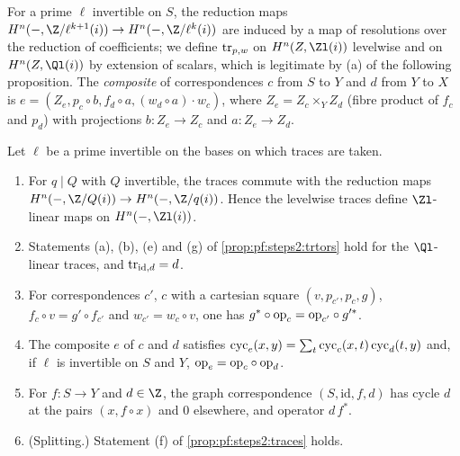 For a prime $\ell$ invertible on $S$, the reduction maps $H^n(-,\Z/\ell^{k+1}(i))\to
H^n(-,\Z/\ell^k(i))$ are induced by a map of resolutions over the reduction of coefficients; we define
$\mathrm{tr}_{p,w}$ on $H^n(Z,\Zl(i))$ levelwise and on $H^n(Z,\Ql(i))$ by extension of scalars, which
is legitimate by (a) of the following proposition. The \emph{composite} of correspondences $c$ from $S$
to $Y$ and $d$ from $Y$ to $X$ is $e=(Z_e,p_c\circ b,f_d\circ a,(w_d\circ a)\cdot w_c)$, where
$Z_e=Z_c\times_YZ_d$ (fibre product of $f_c$ and $p_d$) with projections $b\colon Z_e\to Z_c$ and
$a\colon Z_e\to Z_d$.

\begin{proposition}\label{prop:pf:steps2:tradic}
Let $\ell$ be a prime invertible on the bases on which traces are taken.
\begin{enumerate}[label=\textup{(\alph*)},nosep]
\item For $q\mid Q$ with $Q$ invertible, the traces commute with the reduction maps
  $H^n(-,\Z/Q(i))\to H^n(-,\Z/q(i))$. Hence the levelwise traces define $\Zl$-linear maps on
  $H^n(-,\Zl(i))$.
\item Statements \textup{(a)}, \textup{(b)}, \textup{(e)} and \textup{(g)} of
  \cref{prop:pf:steps2:trtors} hold for the $\Ql$-linear traces, and $\mathrm{tr}_{\mathrm{id},d}=d$.
\item For correspondences $c'$, $c$ with a cartesian square $(v,p_{c'},p_c,g)$, $f_c\circ
  v=g'\circ f_{c'}$ and $w_{c'}=w_c\circ v$, one has $g^\ast\circ\mathrm{op}_c=\mathrm{op}_{c'}\circ
  g'^\ast$.
\item The composite $e$ of $c$ and $d$ satisfies $\mathrm{cyc}_e(x,y)=\sum_t\mathrm{cyc}_c(x,t)\,
  \mathrm{cyc}_d(t,y)$ and, if $\ell$ is invertible on $S$ and $Y$, $\mathrm{op}_e=\mathrm{op}_c\circ
  \mathrm{op}_d$.
\item For $f\colon S\to Y$ and $d\in\Z$, the graph correspondence $(S,\mathrm{id},f,d)$ has cycle $d$ at
  the pairs $(x,f\circ x)$ and $0$ elsewhere, and operator $d\,f^\ast$.
\item \textup{(Splitting.)} Statement \textup{(f)} of \cref{prop:pf:steps2:traces} holds.
\end{enumerate}
\end{proposition}

